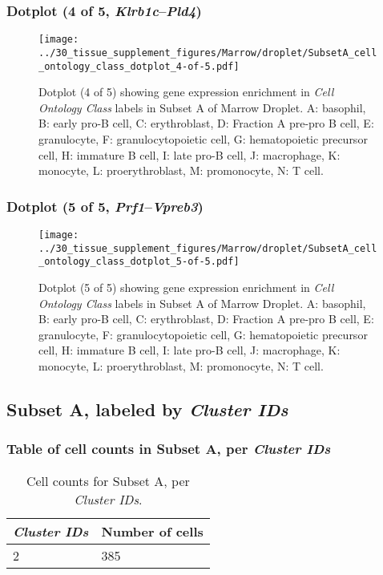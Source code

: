 \clearpage

\subsubsection{Dotplot (4 of 5, \emph{Klrb1c}--\emph{Pld4})}
\begin{figure}[h]
\centering
\texttt{[image: ../30\_tissue\_supplement\_figures/Marrow/droplet/SubsetA\_cell\_ontology\_class\_dotplot\_4-of-5.pdf]}

\caption{ Dotplot (4 of 5)  showing gene expression enrichment in \emph{Cell Ontology Class} labels in Subset A of Marrow Droplet. A: basophil, B: early pro-B cell, C: erythroblast, D: Fraction A pre-pro B cell, E: granulocyte, F: granulocytopoietic cell, G: hematopoietic precursor cell, H: immature B cell, I: late pro-B cell, J: macrophage, K: monocyte, L: proerythroblast, M: promonocyte, N: T cell.}
\end{figure}


\clearpage

\subsubsection{Dotplot (5 of 5, \emph{Prf1}--\emph{Vpreb3})}
\begin{figure}[h]
\centering
\texttt{[image: ../30\_tissue\_supplement\_figures/Marrow/droplet/SubsetA\_cell\_ontology\_class\_dotplot\_5-of-5.pdf]}

\caption{ Dotplot (5 of 5)  showing gene expression enrichment in \emph{Cell Ontology Class} labels in Subset A of Marrow Droplet. A: basophil, B: early pro-B cell, C: erythroblast, D: Fraction A pre-pro B cell, E: granulocyte, F: granulocytopoietic cell, G: hematopoietic precursor cell, H: immature B cell, I: late pro-B cell, J: macrophage, K: monocyte, L: proerythroblast, M: promonocyte, N: T cell.}
\end{figure}


\clearpage

\subsection{Subset A, labeled by \emph{Cluster IDs}}
\subsubsection{Table of cell counts in Subset A, per \emph{Cluster IDs}}\begin{table}[h]
\centering
\label{my-label}
\begin{tabular}{@{}ll@{}}
\toprule

\emph{Cluster IDs}& Number of cells \\ \midrule
2 & 385 \\
\bottomrule
\end{tabular}
\caption{Cell counts for Subset A, per \emph{Cluster IDs}.}
\end{table}

